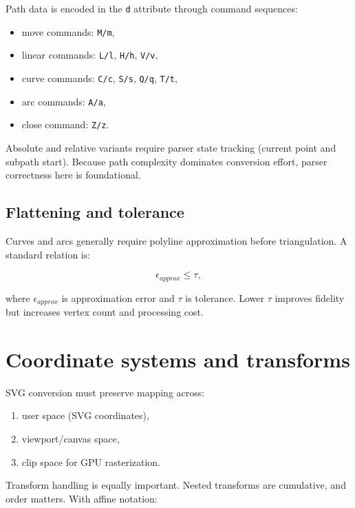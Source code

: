 Path data is encoded in the \texttt{d} attribute through command sequences:

\begin{itemize}
\item move commands: \texttt{M/m},
\item linear commands: \texttt{L/l}, \texttt{H/h}, \texttt{V/v},
\item curve commands: \texttt{C/c}, \texttt{S/s}, \texttt{Q/q}, \texttt{T/t},
\item arc commands: \texttt{A/a},
\item close command: \texttt{Z/z}.
\end{itemize}

Absolute and relative variants require parser state tracking (current point and subpath start).
Because path complexity dominates conversion effort, parser correctness here is foundational.

\subsection{Flattening and tolerance}

Curves and arcs generally require polyline approximation before triangulation.
A standard relation is:

\begin{equation}
\epsilon_{approx} \leq \tau,
\label{eq:svg_flattening_error}
\end{equation}

where $\epsilon_{approx}$ is approximation error and $\tau$ is tolerance.
Lower $\tau$ improves fidelity but increases vertex count and processing cost.

\section{Coordinate systems and transforms}

SVG conversion must preserve mapping across:

\begin{enumerate}
\item user space (SVG coordinates),
\item viewport/canvas space,
\item clip space for GPU rasterization.
\end{enumerate}

Transform handling is equally important.
Nested transforms are cumulative, and order matters.
With affine notation:

